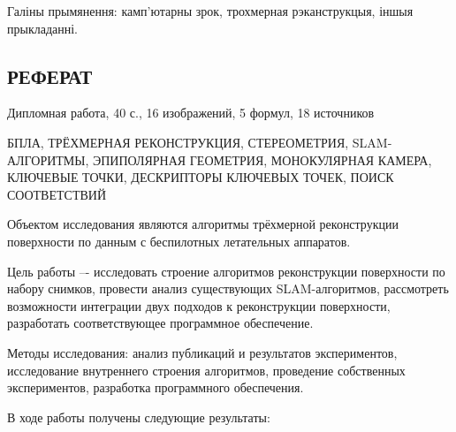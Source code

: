 \begin{titlepage}
    \vspace{4mm}

    Галіны прымянення: камп'ютарны зрок, трохмерная рэканструкцыя, іншыя прыкладанні.
\end{titlepage}

\newpage

\begin{titlepage}
    \begin{center}
        \section*{РЕФЕРАТ}
    \end{center}

    \vspace{10mm}

    Дипломная работа, 40 с., 16 изображений, 5 формул, 18 источников

    \vspace{4mm}

    БПЛА, ТРЁХМЕРНАЯ РЕКОНСТРУКЦИЯ, СТЕРЕОМЕТРИЯ, SLAM-АЛГОРИТМЫ, ЭПИПОЛЯРНАЯ ГЕОМЕТРИЯ,
    МОНОКУЛЯРНАЯ КАМЕРА, КЛЮЧЕВЫЕ ТОЧКИ, ДЕСКРИПТОРЫ КЛЮЧЕВЫХ ТОЧЕК, ПОИСК СООТВЕТСТВИЙ

    \vspace{4mm}

    Объектом исследования являются алгоритмы трёхмерной реконструкции поверхности
    по данным с беспилотных летательных аппаратов.

    \vspace{4mm}

    Цель работы –- исследовать строение алгоритмов реконструкции поверхности по набору снимков,
    провести анализ существующих SLAM-алгоритмов, рассмотреть возможности интеграции двух подходов
    к реконструкции поверхности, разработать соответствующее программное обеспечение.

    \vspace{4mm}

    Методы исследования: анализ публикаций и результатов экспериментов,
    исследование внутреннего строения алгоритмов, проведение собственных экспериментов,
    разработка программного обеспечения.

    \vspace{4mm}

    В ходе работы получены следующие результаты:

    \vspace{4mm}


\end{titlepage}
